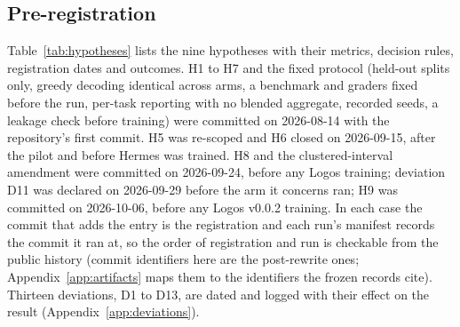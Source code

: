 \subsection{Pre-registration}
Table~\ref{tab:hypotheses} lists the nine hypotheses with their metrics, decision rules, registration dates and outcomes. H1 to H7 and the fixed protocol (held-out splits only, greedy decoding identical across arms, a benchmark and graders fixed before the run, per-task reporting with no blended aggregate, recorded seeds, a leakage check before training) were committed on 2026-08-14 with the repository's first commit. H5 was re-scoped and H6 closed on 2026-09-15, after the pilot and before Hermes was trained. H8 and the clustered-interval amendment were committed on 2026-09-24, before any Logos training; deviation D11 was declared on 2026-09-29 before the arm it concerns ran; H9 was committed on 2026-10-06, before any Logos v0.0.2 training. In each case the commit that adds the entry is the registration and each run's manifest records the commit it ran at, so the order of registration and run is checkable from the public history (commit identifiers here are the post-rewrite ones; Appendix~\ref{app:artifacts} maps them to the identifiers the frozen records cite). Thirteen deviations, D1 to D13, are dated and logged with their effect on the result (Appendix~\ref{app:deviations}).

